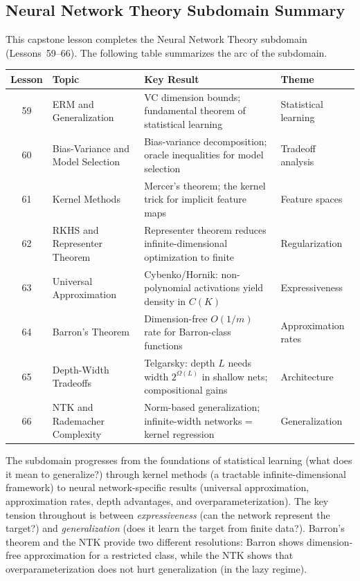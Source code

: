 \documentclass[11pt,a4paper]{article}
\begin{document}
\subsection*{Neural Network Theory Subdomain Summary}

This capstone lesson completes the Neural Network Theory subdomain
(Lessons~59--66).  The following table summarizes the arc of the
subdomain.

\begin{center}
\small
\begin{tabular}{clp{5cm}l}
\toprule
\textbf{Lesson} & \textbf{Topic} & \textbf{Key Result} & \textbf{Theme} \\
\midrule
59 & ERM and Generalization & VC dimension bounds;
  fundamental theorem of statistical learning &
  Statistical learning \\
60 & Bias-Variance and Model Selection & Bias-variance decomposition;
  oracle inequalities for model selection &
  Tradeoff analysis \\
61 & Kernel Methods & Mercer's theorem; the kernel trick
  for implicit feature maps &
  Feature spaces \\
62 & RKHS and Representer Theorem & Representer theorem reduces
  infinite-dimensional optimization to finite &
  Regularization \\
63 & Universal Approximation & Cybenko/Hornik: non-polynomial
  activations yield density in $C(K)$ &
  Expressiveness \\
64 & Barron's Theorem & Dimension-free $O(1/m)$ rate for
  Barron-class functions &
  Approximation rates \\
65 & Depth-Width Tradeoffs & Telgarsky: depth $L$ needs width
  $2^{\Omega(L)}$ in shallow nets; compositional gains &
  Architecture \\
66 & NTK and Rademacher Complexity & Norm-based generalization;
  infinite-width networks = kernel regression &
  Generalization \\
\bottomrule
\end{tabular}
\end{center}

The subdomain progresses from the foundations of statistical learning
(what does it mean to generalize?) through kernel methods (a tractable
infinite-dimensional framework) to neural network-specific results
(universal approximation, approximation rates, depth advantages, and
overparameterization).  The key tension throughout is between
\emph{expressiveness} (can the network represent the target?) and
\emph{generalization} (does it learn the target from finite data?).
Barron's theorem and the NTK provide two different resolutions: Barron
shows dimension-free approximation for a restricted class, while the
NTK shows that overparameterization does not hurt generalization
(in the lazy regime).
\end{document}
